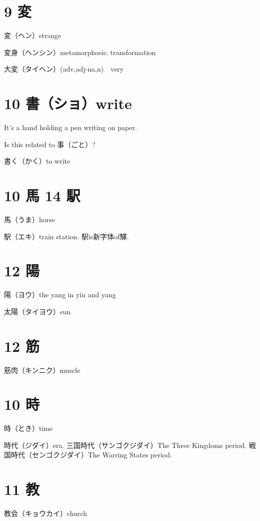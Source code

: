 \section{9 変}

変（ヘン）strange

変身（ヘンシン）metamorphosis; transformation

大変（タイヘン）(adv,adj-na,n)　very

\section{10 書（ショ）write}

It's a hand holding a pen writing on paper.

Is this related to 事（ごと）?

書く（かく）to write

\section{10 馬 14 駅}

馬（うま）horse

駅（エキ）train station. 駅is新字体of驛.

\section{12 陽}

陽（ヨウ）the yang in yin and yang

太陽（タイヨウ）sun

\section{12 筋}

筋肉（キンニク）muscle

\section{10 時}

時（とき）time

時代（ジダイ）era.
三国時代（サンゴクジダイ）The Three Kingdoms period.
戦国時代（センゴクジダイ）The Warring States period.

\section{11 教}

教会（キョウカイ）church

